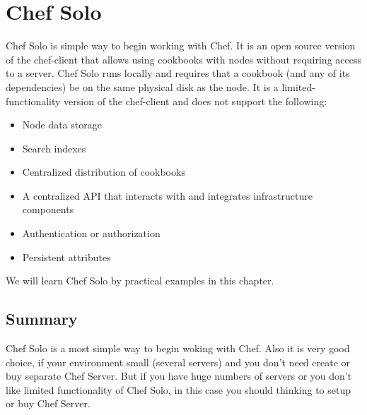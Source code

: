 \chapter{Chef Solo}

Chef Solo is simple way to begin working with Chef. It is an open source version of the chef-client that allows using cookbooks with nodes without requiring access to a server. Chef Solo runs locally and requires that a cookbook (and any of its dependencies) be on the same physical disk as the node. It is a limited-functionality version of the chef-client and does not support the following:

\begin{itemize}
  \item Node data storage
  \item Search indexes
  \item Centralized distribution of cookbooks
  \item A centralized API that interacts with and integrates infrastructure components
  \item Authentication or authorization
  \item Persistent attributes
\end{itemize}

We will learn Chef Solo by practical examples in this chapter.












\section{Summary}

Chef Solo is a most simple way to begin woking with Chef. Also it is very good choice, if your environment small (several servers) and you don't need create or buy separate Chef Server. But if you have huge numbers of servers or you don't like limited functionality of Chef Solo, in this case you should thinking to setup or buy Chef Server.